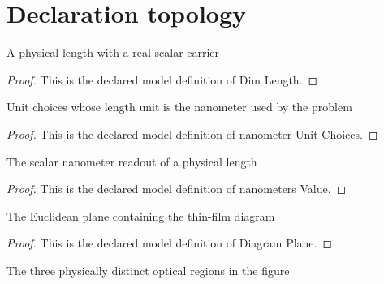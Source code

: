 \section{Declaration topology}
\begin{definition}
  \label{def:physics:phyx-mini-0127:phyxminiproblems-problemphyxmini0127-dimlength}
  A physical length with a real scalar carrier
\end{definition}
\begin{proof}
  This is the declared model definition of Dim Length.
\end{proof}
\begin{definition}
  \label{def:physics:phyx-mini-0127:phyxminiproblems-problemphyxmini0127-nanometerunitchoices}
  Unit choices whose length unit is the nanometer used by the problem
\end{definition}
\begin{proof}
  This is the declared model definition of nanometer Unit Choices.
\end{proof}
\begin{definition}
  \label{def:physics:phyx-mini-0127:phyxminiproblems-problemphyxmini0127-nanometersvalue}
  The scalar nanometer readout of a physical length
\end{definition}
\begin{proof}
  This is the declared model definition of nanometers Value.
\end{proof}
\begin{definition}
  \label{def:physics:phyx-mini-0127:phyxminiproblems-problemphyxmini0127-diagramplane}
  The Euclidean plane containing the thin-film diagram
\end{definition}
\begin{proof}
  This is the declared model definition of Diagram Plane.
\end{proof}
\begin{definition}
  \label{def:physics:phyx-mini-0127:phyxminiproblems-problemphyxmini0127-opticalregion}
  The three physically distinct optical regions in the figure
\end{definition}

